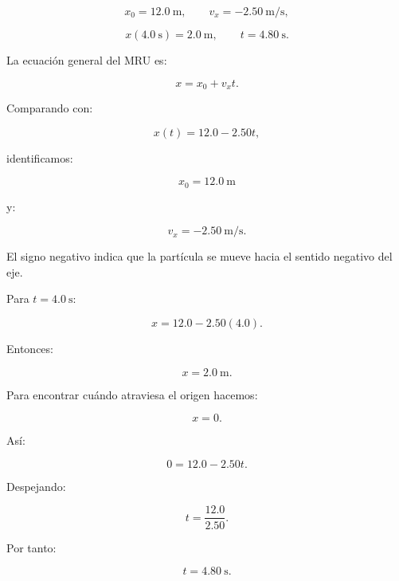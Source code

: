 \begin{respuesta}
\[
x_0=\SI{12.0}{\meter},
\qquad
v_x=-\SI{2.50}{\meter\per\second},
\]

\[
x(\SI{4.0}{\second})=\SI{2.0}{\meter},
\qquad
t=\SI{4.80}{\second}.
\]
\end{respuesta}

\begin{explicacion}
La ecuación general del MRU es:

\[ x=x_0+v_xt. \]

Comparando con:

\[ x(t)=12.0-2.50t, \]

identificamos:

\[ \boxed{x_0=\SI{12.0}{\meter}} \]

y:

\[ \boxed{v_x=-\SI{2.50}{\meter\per\second}}. \]

El signo negativo indica que la partícula se mueve hacia el sentido negativo del eje.

Para \(t=\SI{4.0}{\second}\):

\[
x
=
12.0
-
2.50(4.0).
\]

Entonces:

\[ \boxed{x=\SI{2.0}{\meter}}. \]

Para encontrar cuándo atraviesa el origen hacemos:

\[ x=0. \]

Así:

\[
0=12.0-2.50t.
\]

Despejando:

\[
t=\frac{12.0}{2.50}.
\]

Por tanto:

\[ \boxed{t=\SI{4.80}{\second}}. \]
\end{explicacion}


